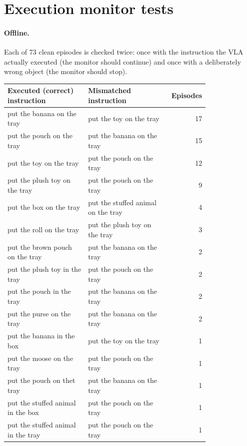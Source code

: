 \section{Execution monitor tests}
\label{app:instr-monitor}
\paragraph{Offline.} Each of 73 clean episodes is checked twice: once with the
instruction the VLA actually executed (the monitor should continue) and once with a
deliberately wrong object (the monitor should stop).
{\small
\begin{longtable}{p{0.4\linewidth} p{0.4\linewidth} r}
\toprule
Executed (correct) instruction & Mismatched instruction & Episodes \\
\midrule
\endhead
put the banana on the tray & put the toy on the tray & 17 \\
put the pouch on the tray & put the banana on the tray & 15 \\
put the toy on the tray & put the pouch on the tray & 12 \\
put the plush toy on the tray & put the pouch on the tray & 9 \\
put the box on the tray & put the stuffed animal on the tray & 4 \\
put the roll on the tray & put the plush toy on the tray & 3 \\
put the brown pouch on the tray & put the banana on the tray & 2 \\
put the plush toy in the tray & put the pouch on the tray & 2 \\
put the pouch in the tray & put the banana on the tray & 2 \\
put the purse on the tray & put the banana on the tray & 2 \\
put the banana in the box & put the toy on the tray & 1 \\
put the moose on the tray & put the pouch on the tray & 1 \\
put the pouch on thet tray & put the banana on the tray & 1 \\
put the stuffed animal in the box & put the pouch on the tray & 1 \\
put the stuffed animal in the tray & put the pouch on the tray & 1 \\
\bottomrule
\end{longtable}}

